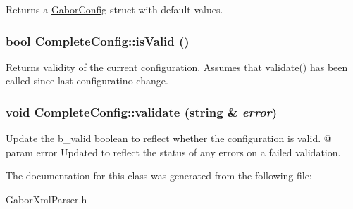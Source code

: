 Returns a \hyperlink{structGaborConfig}{GaborConfig} struct with default values. \hypertarget{classCompleteConfig_ec16272f21426a39ea0e8a81a443d155}{
\subsubsection[{isValid}]{\setlength{\rightskip}{0pt plus 5cm}bool CompleteConfig::isValid ()}}
\label{classCompleteConfig_ec16272f21426a39ea0e8a81a443d155}


Returns validity of the current configuration. Assumes that \hyperlink{classCompleteConfig_ea392139df6e1bbf2f64f631db4800ff}{validate()} has been called since last configuratino change. \hypertarget{classCompleteConfig_ea392139df6e1bbf2f64f631db4800ff}{
\subsubsection[{validate}]{\setlength{\rightskip}{0pt plus 5cm}void CompleteConfig::validate (string \& {\em error})}}
\label{classCompleteConfig_ea392139df6e1bbf2f64f631db4800ff}


Update the b\_\-valid boolean to reflect whether the configuration is valid. @ param error Updated to reflect the status of any errors on a failed validation. 

The documentation for this class was generated from the following file:\begin{CompactItemize}
\item 
GaborXmlParser.h\end{CompactItemize}
